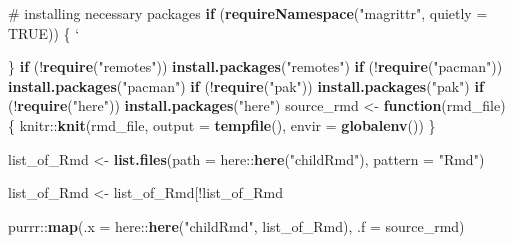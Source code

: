 \documentclass[
]{article}
\newenvironment{Shaded}{\begin{snugshade}}{\end{snugshade}}
\newcommand{\CommentTok}[1]{\textcolor[rgb]{0.54,0.53,0.53}{#1}}
\newcommand{\ControlFlowTok}[1]{\textcolor[rgb]{0.12,0.11,0.11}{\textbf{#1}}}
\newcommand{\DataTypeTok}[1]{\textcolor[rgb]{0.00,0.34,0.68}{#1}}
\newcommand{\KeywordTok}[1]{\textcolor[rgb]{0.12,0.11,0.11}{\textbf{#1}}}
\newcommand{\NormalTok}[1]{\textcolor[rgb]{0.12,0.11,0.11}{#1}}
\newcommand{\OperatorTok}[1]{\textcolor[rgb]{0.12,0.11,0.11}{#1}}
\newcommand{\OtherTok}[1]{\textcolor[rgb]{0.00,0.43,0.16}{#1}}
\newcommand{\StringTok}[1]{\textcolor[rgb]{0.75,0.01,0.01}{#1}}
\begin{document}
\begin{Shaded}
\begin{Highlighting}[]
\CommentTok{# installing necessary packages}
\ControlFlowTok{if}\NormalTok{ (}\KeywordTok{requireNamespace}\NormalTok{(}\StringTok{"magrittr"}\NormalTok{, }\DataTypeTok{quietly =} \OtherTok{TRUE}\NormalTok{)) \{}
  \StringTok{`}\DataTypeTok{%>%}\StringTok{`}\NormalTok{ <-}\StringTok{ }\NormalTok{magrittr}\OperatorTok{::}\StringTok{`}\DataTypeTok{%>%}\StringTok{`}
\NormalTok{\}}
\ControlFlowTok{if}\NormalTok{ (}\OperatorTok{!}\KeywordTok{require}\NormalTok{(}\StringTok{"remotes"}\NormalTok{)) }\KeywordTok{install.packages}\NormalTok{(}\StringTok{"remotes"}\NormalTok{)}
\ControlFlowTok{if}\NormalTok{ (}\OperatorTok{!}\KeywordTok{require}\NormalTok{(}\StringTok{"pacman"}\NormalTok{)) }\KeywordTok{install.packages}\NormalTok{(}\StringTok{"pacman"}\NormalTok{)}
\ControlFlowTok{if}\NormalTok{ (}\OperatorTok{!}\KeywordTok{require}\NormalTok{(}\StringTok{"pak"}\NormalTok{)) }\KeywordTok{install.packages}\NormalTok{(}\StringTok{"pak"}\NormalTok{)}
\ControlFlowTok{if}\NormalTok{ (}\OperatorTok{!}\KeywordTok{require}\NormalTok{(}\StringTok{"here"}\NormalTok{)) }\KeywordTok{install.packages}\NormalTok{(}\StringTok{"here"}\NormalTok{)}
\NormalTok{source_rmd <-}\StringTok{ }\ControlFlowTok{function}\NormalTok{(rmd_file)\{}
\NormalTok{  knitr}\OperatorTok{::}\KeywordTok{knit}\NormalTok{(rmd_file, }\DataTypeTok{output =} \KeywordTok{tempfile}\NormalTok{(), }\DataTypeTok{envir =} \KeywordTok{globalenv}\NormalTok{())}
\NormalTok{\}}

\NormalTok{list_of_Rmd <-}\StringTok{ }\KeywordTok{list.files}\NormalTok{(}\DataTypeTok{path =}\NormalTok{ here}\OperatorTok{::}\KeywordTok{here}\NormalTok{(}\StringTok{"childRmd"}\NormalTok{), }\DataTypeTok{pattern =} \StringTok{"Rmd"}\NormalTok{)}

\NormalTok{list_of_Rmd <-}\StringTok{ }\NormalTok{list_of_Rmd[}\OperatorTok{!}\NormalTok{list_of_Rmd }\OperatorTok{%in%}\StringTok{ }\KeywordTok{c}\NormalTok{(}\StringTok{"_19shinySurvival.Rmd"}\NormalTok{)]}

\NormalTok{purrr}\OperatorTok{::}\KeywordTok{map}\NormalTok{(}\DataTypeTok{.x =}\NormalTok{ here}\OperatorTok{::}\KeywordTok{here}\NormalTok{(}\StringTok{"childRmd"}\NormalTok{, list_of_Rmd), }\DataTypeTok{.f =}\NormalTok{ source_rmd)}

}}
\end{Highlighting}
\end{Shaded}
\end{document}
